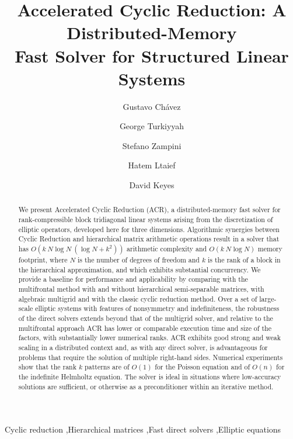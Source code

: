 \documentclass[]{elsarticle}
\begin{document}
\begin{frontmatter}
	\title{Accelerated Cyclic Reduction: A Distributed-Memory \\ Fast Solver for Structured Linear Systems}
	\author[kaust-ecrc]{Gustavo Ch{\'a}vez}
	\author[aub-cs]{George Turkiyyah}
	\author[kaust-ecrc]{Stefano Zampini}
	\author[kaust-ecrc]{Hatem Ltaief}
	\author[kaust-ecrc]{David Keyes}

	\address[kaust-ecrc]{King Abdullah University of Science and Technology (KAUST).}
	\address[aub-cs]{Department of Computer Science, American University of Beirut (AUB).}

	\begin{abstract}
	We present Accelerated Cyclic Reduction (ACR), a distributed-memory fast solver for rank-compressible block tridiagonal linear systems arising from the discretization of elliptic operators, developed here for three dimensions.
	Algorithmic synergies between Cyclic Reduction and hierarchical matrix arithmetic operations result in a solver that has $O(k~N \log N~(\log N + k^2))$ arithmetic complexity and $O(k~N \log N)$ memory footprint, where $N$ is the number of degrees of freedom and $k$ is the rank of a block in the hierarchical approximation, and which exhibits substantial concurrency.
	We provide a baseline for performance and applicability by comparing with the multifrontal method with and without hierarchical semi-separable matrices, with algebraic multigrid and with the classic cyclic reduction method.
	Over a set of large-scale elliptic systems with features of nonsymmetry and indefiniteness, the robustness of the direct solvers extends beyond that of the multigrid solver, and relative to the multifrontal approach ACR has lower or comparable execution time and size of the factors, with substantially lower numerical ranks.
	ACR exhibits good strong and weak scaling in a distributed context and, as with any direct solver, is advantageous for problems that require the solution of multiple right-hand sides.
	Numerical experiments show that the rank $k$ patterns are of $O(1)$ for the Poisson equation and of $O(n)$ for the indefinite Helmholtz equation.
	The solver is ideal in situations where low-accuracy solutions are sufficient, or otherwise as a preconditioner within an iterative method.
	\end{abstract}

	\begin{keyword}
	Cyclic reduction \sep Hierarchical matrices \sep Fast direct solvers \sep Elliptic equations
	\end{keyword}
\end{frontmatter}
\end{document}
